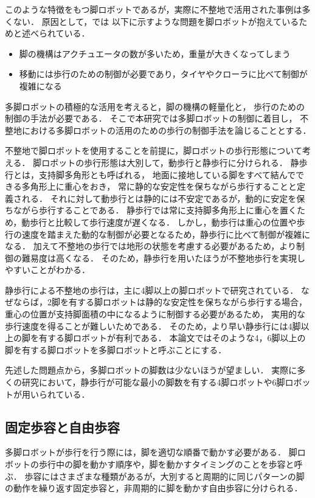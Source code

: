 このような特徴をもつ脚ロボットであるが，実際に不整地で活用された事例は多くない．
原因として，\cite{Locomotion_for_difficult_terrain}では
以下に示すような問題を脚ロボットが抱えているためと述べられている．

\begin{itemize}
  \item 脚の機構はアクチュエータの数が多いため，重量が大きくなってしまう
  \item 移動には歩行のための制御が必要であり，タイヤやクローラに比べて制御が複雑になる
\end{itemize}

多脚ロボットの積極的な活用を考えると，脚の機構の軽量化と，
歩行のための制御の手法が必要である．
そこで本研究では多脚ロボットの制御に着目し，
不整地における多脚ロボットの活用のための歩行の制御手法を論じることとする．

不整地で脚ロボットを使用することを前提に，脚ロボットの歩行形態について考える．
脚ロボットの歩行形態は大別して，動歩行と静歩行に分けられる．
静歩行とは，支持脚多角形とも呼ばれる，
地面に接地している脚をすべて結んでできる多角形上に重心をおき，
常に静的な安定性を保ちながら歩行することと定義される\cite{Hirose_Static_stability_criterion}．
それに対して動歩行とは静的には不安定であるが，動的に安定を保ちながら歩行することである．
静歩行では常に支持脚多角形上に重心を置くため，動歩行と比較して歩行速度が遅くなる．
しかし，動歩行は重心の位置や歩行の速度を踏まえた動的な制御が必要となるため，静歩行に比べて制御が複雑になる．
加えて不整地の歩行では地形の状態を考慮する必要があるため，より制御の難易度は高くなる．
そのため，静歩行を用いたほうが不整地歩行を実現しやすいことがわかる．

静歩行による不整地の歩行は，主に4脚以上の脚ロボットで研究されている．
なぜならば，2脚を有する脚ロボットは静的な安定性を保ちながら歩行する場合，
重心の位置が支持脚面積の中になるように制御する必要があるため，
実用的な歩行速度を得ることが難しいためである．
そのため，より早い静歩行には4脚以上の脚を有する脚ロボットが有利である．
本論文ではそのような4，6脚以上の脚を有する脚ロボットを多脚ロボットと呼ぶことにする．

先述した問題点から，多脚ロボットの脚数は少ないほうが望ましい．
実際に多くの研究において，静歩行が可能な最小の脚数を有する4脚ロボットや6脚ロボットが用いられている．

\subsection{固定歩容と自由歩容}
多脚ロボットが歩行を行う際には，脚を適切な順番で動かす必要がある．
脚ロボットの歩行中の脚を動かす順序や，脚を動かすタイミングのことを歩容と呼ぶ．
歩容にはさまざまな種類があるが，大別すると周期的に同じパターンの脚の動作を繰り返す固定歩容と，非周期的に脚を動かす自由歩容に分けられる．

